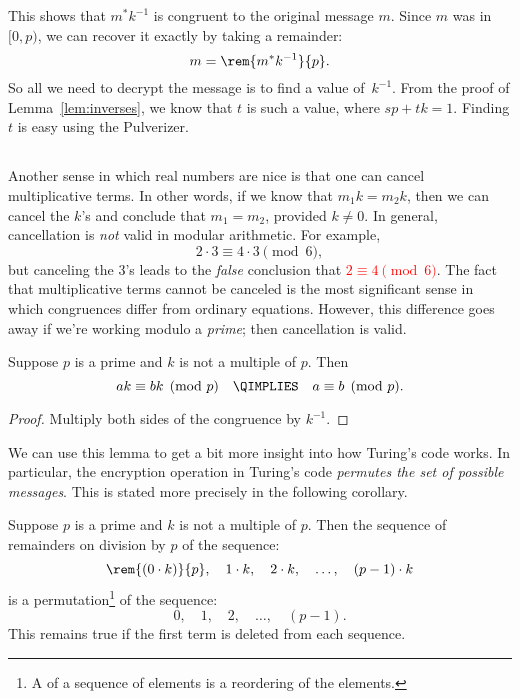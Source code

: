 This shows that $m^* k^{-1}$ is congruent to the original message $m$.  Since $m$ was in
$[0,p)$, we can recover it exactly by taking a remainder:
\[
m = \rem{m^* k^{-1}}{p}.
\]
So all we need to decrypt the message is to find a value of~$k^{-1}$.  From the proof of
Lemma~\ref{lem:inverses}, we know that $t$ is such a value, where $sp + tk = 1$.  Finding
$t$ is easy using the Pulverizer.

\subsection{}

Another sense in which real numbers are nice is that one can cancel multiplicative terms.
In other words, if we know that $m_1 k = m_2 k$, then we can cancel the $k$'s and conclude
that $m_1 = m_2$, provided $k \neq 0$.  In general, cancellation is \emph{not} valid in
modular arithmetic.  For example,
\[
2 \cdot 3 \equiv 4 \cdot 3 \pmod{6},
\]
but canceling the 3's leads to the \emph{false} conclusion that \textcolor{red}{$2 \equiv
4 \pmod{6}$}.  The fact that multiplicative terms cannot be canceled is the most
significant sense in which congruences differ from ordinary equations.  However, this
difference goes away if we're working modulo a \emph{prime}; then cancellation is valid.

\begin{lemma}
\label{lem:cancel}
Suppose $p$ is a prime and $k$ is not a multiple of $p$.  Then
\[
ak \equiv bk \pmod{p}\quad \QIMPLIES\quad a \equiv b \pmod{p}.
\]
\end{lemma}

\begin{proof}
Multiply both sides of the congruence by $k^{-1}$.
\end{proof}

We can use this lemma to get a bit more insight into how Turing's code works.  In
particular, the encryption operation in Turing's code \emph{permutes the set of possible
  messages}.  This is stated more precisely in the following corollary.

\begin{corollary}
\label{cor:prime-permutes}
Suppose $p$ is a prime and $k$ is not a multiple of $p$.  Then the sequence of remainders
on division by $p$ of the sequence:
\[
\rem{(0 \cdot k)}{p},\quad 1 \cdot k,\quad 2 \cdot k,\quad \dots,\quad (p-1) \cdot k
\]
is a permutation\footnote{A  of a sequence of elements is a reordering of
  the elements.} of the sequence:
\[
0,\quad 1,\quad 2,\quad \dots,\quad (p - 1).
\]
This remains true if the first term is deleted from each sequence.
\end{corollary}

